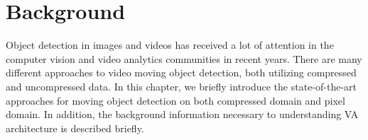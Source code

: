 \chapter{Background}
Object detection in images and videos has received a lot of attention in the computer vision and video analytics communities in recent years. There are many different approaches to video moving object detection, both utilizing compressed and uncompressed data. In this chapter, we briefly introduce the state-of-the-art approaches for moving object detection on both compressed domain and pixel domain. In addition, the background information necessary to understanding VA architecture is described briefly.
